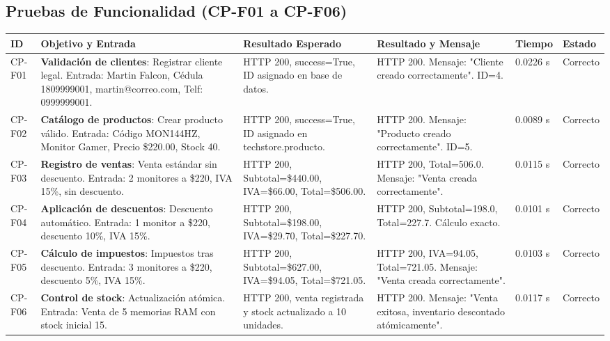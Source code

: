 \documentclass{article}
\begin{document}
\subsection{Pruebas de Funcionalidad (CP-F01 a CP-F06)}
\begin{longtable}{|p{}|p{}|p{}|p{}|p{}|p{}|}
\hline
\textbf{ID} & \textbf{Objetivo y Entrada} & \textbf{Resultado Esperado} & \textbf{Resultado y Mensaje} & \textbf{Tiempo} & \textbf{Estado}\\
\hline
\endhead
CP-F01 & \textbf{Validación de clientes}: Registrar cliente legal. Entrada: Martin Falcon, Cédula 1809999001, martin@correo.com, Telf: 0999999001. & HTTP 200, success=True, ID asignado en base de datos. & HTTP 200. Mensaje: "Cliente creado correctamente". ID=4. & 0.0226 s & Correcto\\ \hline
CP-F02 & \textbf{Catálogo de productos}: Crear producto válido. Entrada: Código MON144HZ, Monitor Gamer, Precio \$220.00, Stock 40. & HTTP 200, success=True, ID asignado en techstore.producto. & HTTP 200. Mensaje: "Producto creado correctamente". ID=5. & 0.0089 s & Correcto\\ \hline
CP-F03 & \textbf{Registro de ventas}: Venta estándar sin descuento. Entrada: 2 monitores a \$220, IVA 15\%, sin descuento. & HTTP 200, Subtotal=\$440.00, IVA=\$66.00, Total=\$506.00. & HTTP 200, Total=506.0. Mensaje: "Venta creada correctamente". & 0.0115 s & Correcto\\ \hline
CP-F04 & \textbf{Aplicación de descuentos}: Descuento automático. Entrada: 1 monitor a \$220, descuento 10\%, IVA 15\%. & HTTP 200, Subtotal=\$198.00, IVA=\$29.70, Total=\$227.70. & HTTP 200, Subtotal=198.0, Total=227.7. Cálculo exacto. & 0.0101 s & Correcto\\ \hline
CP-F05 & \textbf{Cálculo de impuestos}: Impuestos tras descuento. Entrada: 3 monitores a \$220, descuento 5\%, IVA 15\%. & HTTP 200, Subtotal=\$627.00, IVA=\$94.05, Total=\$721.05. & HTTP 200, IVA=94.05, Total=721.05. Mensaje: "Venta creada correctamente". & 0.0103 s & Correcto\\ \hline
CP-F06 & \textbf{Control de stock}: Actualización atómica. Entrada: Venta de 5 memorias RAM con stock inicial 15. & HTTP 200, venta registrada y stock actualizado a 10 unidades. & HTTP 200. Mensaje: "Venta exitosa, inventario descontado atómicamente". & 0.0117 s & Correcto\\ \hline
\end{longtable}
\end{document}
